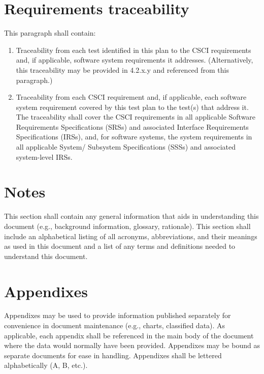 \documentclass{fidata-report-template}
\begin{document}
\section{Requirements traceability}

This paragraph shall contain:

\begin{enumerate}
\itemsep1pt\parskip0pt
\item
  Traceability from each test identified in this plan to the CSCI
  requirements and, if applicable, software system requirements it
  addresses. (Alternatively, this traceability may be provided in
  4.2.x.y and referenced from this paragraph.)
\item
  Traceability from each CSCI requirement and, if applicable, each
  software system requirement covered by this test plan to the test(s)
  that address it. The traceability shall cover the CSCI requirements in
  all applicable Software Requirements Specifications (SRSs) and
  associated Interface Requirements Specifications (IRSs), and, for
  software systems, the system requirements in all applicable System/
  Subsystem Specifications (SSSs) and associated system-level IRSs.
\end{enumerate}

\section{Notes}

This section shall contain any general information that aids in
understanding this document (e.g., background information, glossary,
rationale). This section shall include an alphabetical listing of all
acronyms, abbreviations, and their meanings as used in this document and
a list of any terms and definitions needed to understand this document.

\appendix

\section{Appendixes}

Appendixes may be used to provide information published separately for
convenience in document maintenance (e.g., charts, classified data). As
applicable, each appendix shall be referenced in the main body of the
document where the data would normally have been provided. Appendixes
may be bound as separate documents for ease in handling. Appendixes
shall be lettered alphabetically (A, B, etc.).
\end{document}
